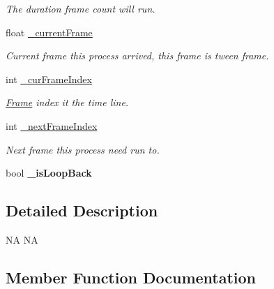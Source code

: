 \begin{DoxyCompactItemize}
\begin{DoxyCompactList}\small\item\em The duration frame count will run. \end{DoxyCompactList}\item 
\mbox{\label{classcocostudio_1_1ProcessBase_a5c7a5916eefb69b3cc8c1c9096b8ac2d}} 
float \hyperlink{classcocostudio_1_1ProcessBase_a5c7a5916eefb69b3cc8c1c9096b8ac2d}{\+\_\+current\+Frame}
\begin{DoxyCompactList}\small\item\em Current frame this process arrived, this frame is tween frame. \end{DoxyCompactList}\item 
\mbox{\label{classcocostudio_1_1ProcessBase_af0f905771dbce4ec0224b6864dad5845}} 
int \hyperlink{classcocostudio_1_1ProcessBase_af0f905771dbce4ec0224b6864dad5845}{\+\_\+cur\+Frame\+Index}
\begin{DoxyCompactList}\small\item\em \hyperlink{classFrame}{Frame} index it the time line. \end{DoxyCompactList}\item 
\mbox{\label{classcocostudio_1_1ProcessBase_a0e1b20545a5f6268142460901a706428}} 
int \hyperlink{classcocostudio_1_1ProcessBase_a0e1b20545a5f6268142460901a706428}{\+\_\+next\+Frame\+Index}
\begin{DoxyCompactList}\small\item\em Next frame this process need run to. \end{DoxyCompactList}\item 
\mbox{\label{classcocostudio_1_1ProcessBase_a440aeae9469924848fbaa63c3a525470}} 
bool {\bfseries \+\_\+is\+Loop\+Back}
\end{DoxyCompactItemize}


\subsection{Detailed Description}
NA  NA 

\subsection{Member Function Documentation}
\mbox{\label{classcocostudio_1_1ProcessBase_a637a84b4d12652a27ce0465c9f805730}} 

